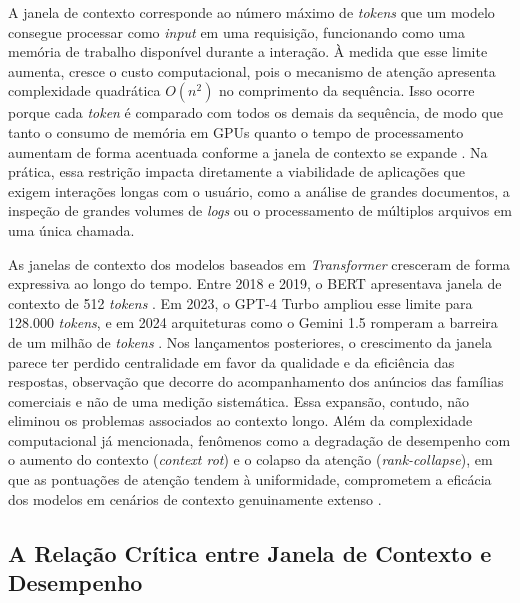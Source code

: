 A janela de contexto corresponde ao número máximo de \textit{tokens} que um modelo consegue processar como \textit{input} em uma requisição, funcionando como uma memória de trabalho disponível durante a interação. À medida que esse limite aumenta, cresce o custo computacional, pois o mecanismo de atenção apresenta complexidade quadrática $O(n^2)$ no comprimento da sequência. Isso ocorre porque cada \textit{token} é comparado com todos os demais da sequência, de modo que tanto o consumo de memória em GPUs quanto o tempo de processamento aumentam de forma acentuada conforme a janela de contexto se expande \cite{vaswani2017attention,huang2024longcontext}. Na prática, essa restrição impacta diretamente a viabilidade de aplicações que exigem interações longas com o usuário, como a análise de grandes documentos, a inspeção de grandes volumes de \textit{logs} ou o processamento de múltiplos arquivos em uma única chamada.

As janelas de contexto dos modelos baseados em \textit{Transformer} cresceram de forma expressiva ao longo do tempo. Entre 2018 e 2019, o BERT apresentava janela de contexto de 512 \textit{tokens} \cite{devlin2019bert}. Em 2023, o GPT-4 Turbo ampliou esse limite para 128.000 \textit{tokens}, e em 2024 arquiteturas como o Gemini 1.5 romperam a barreira de um milhão de \textit{tokens} \cite{reid2024gemini15}.
Nos lançamentos posteriores, o crescimento da janela parece ter perdido centralidade em favor da qualidade e da eficiência das respostas, observação que decorre do acompanhamento dos anúncios das famílias comerciais e não de uma medição sistemática.
Essa expansão, contudo, não eliminou os problemas associados ao contexto longo. Além da complexidade computacional já mencionada, fenômenos como a degradação de desempenho com o aumento do contexto (\textit{context rot}) \cite{chroma2024curse} e o colapso da atenção (\textit{rank-collapse}), em que as pontuações de atenção tendem à uniformidade, comprometem a eficácia dos modelos em cenários de contexto genuinamente extenso \cite{chen2025criticalattention}.

\subsection{A Relação Crítica entre Janela de Contexto e Desempenho}
\label{subsec:problema-critico}

